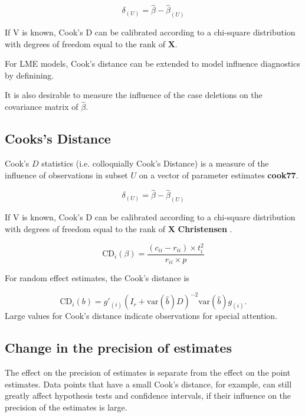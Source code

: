\documentclass[12pt, a4paper]{article}
\begin{document}
\[ \delta_{(U)} = \hat{\beta} - \hat{\beta}_{(U)}\]

If V is known, Cook's D can be calibrated according to a chi-square distribution with degrees of freedom equal to the rank of $\boldsymbol{X}$.




For LME models, Cook's distance can be extended to model influence diagnostics by definining.


It is also desirable to measure the influence of the case deletions on the covariance matrix of $\hat{\beta}$.
\newpage
\subsection{Cooks's Distance}%

Cook's $D$ statistics (i.e. colloquially Cook's Distance) is a measure of the influence of observations in subset $U$ on a vector of parameter estimates \textbf{cook77}.

\[ \delta_{(U)} = \hat{\beta} - \hat{\beta}_{(U)}\]

If V is known, Cook's D can be calibrated according to a chi-square distribution with degrees of freedom equal to the rank of $\boldsymbol{X}$ \textbf{Christensen} \citep{cpj92}.


\[
\mbox{CD}_{i}(\beta) = \frac{(c_{ii} - r_{ii}) \times t^2_{i}}{r_{ii} \times p}
\]

For random effect estimates, the  Cook's distance is

\[
\mbox{CD}_{i}(b) = g{\prime}_{(i)} (I_{r} + \mbox{var}(\hat{b})D)^{-2}\mbox{var}(\hat{b})g_{(i)}.
\]
Large values for Cook's distance indicate observations for special attention.

\subsection{Change in the precision of estimates}

The effect on the precision of estimates is separate from the effect on the point estimates. Data points that
have a small Cook's distance, for example, can still greatly affect hypothesis tests and confidence intervals, if their  influence on the precision of the estimates is large.
\end{document}
